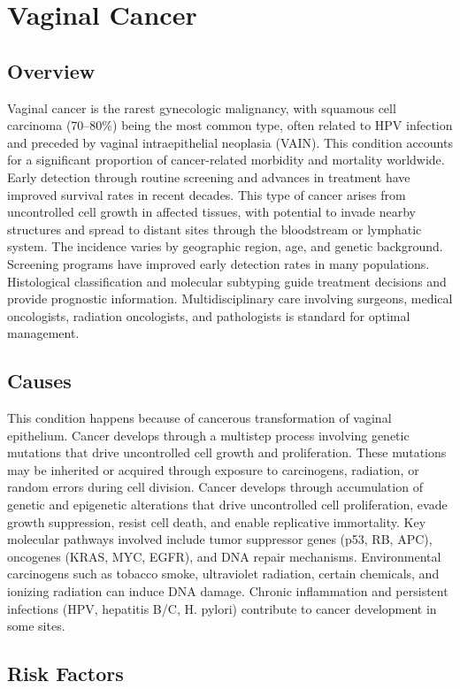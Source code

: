\chapter{Vaginal Cancer}
\label{sec:Vaginal Cancer}

\section{Overview}
Vaginal cancer is the rarest gynecologic malignancy, with squamous cell carcinoma (70--80\%) being the most common type, often related to HPV infection and preceded by vaginal intraepithelial neoplasia (VAIN). This condition accounts for a significant proportion of cancer-related morbidity and mortality worldwide. Early detection through routine screening and advances in treatment have improved survival rates in recent decades. This type of cancer arises from uncontrolled cell growth in affected tissues, with potential to invade nearby structures and spread to distant sites through the bloodstream or lymphatic system. The incidence varies by geographic region, age, and genetic background. Screening programs have improved early detection rates in many populations. Histological classification and molecular subtyping guide treatment decisions and provide prognostic information. Multidisciplinary care involving surgeons, medical oncologists, radiation oncologists, and pathologists is standard for optimal management.
\section{Causes}
This condition happens because of cancerous transformation of vaginal epithelium. Cancer develops through a multistep process involving genetic mutations that drive uncontrolled cell growth and proliferation. These mutations may be inherited or acquired through exposure to carcinogens, radiation, or random errors during cell division. Cancer develops through accumulation of genetic and epigenetic alterations that drive uncontrolled cell proliferation, evade growth suppression, resist cell death, and enable replicative immortality. Key molecular pathways involved include tumor suppressor genes (p53, RB, APC), oncogenes (KRAS, MYC, EGFR), and DNA repair mechanisms. Environmental carcinogens such as tobacco smoke, ultraviolet radiation, certain chemicals, and ionizing radiation can induce DNA damage. Chronic inflammation and persistent infections (HPV, hepatitis B/C, H. pylori) contribute to cancer development in some sites.
\section{Risk Factors}

